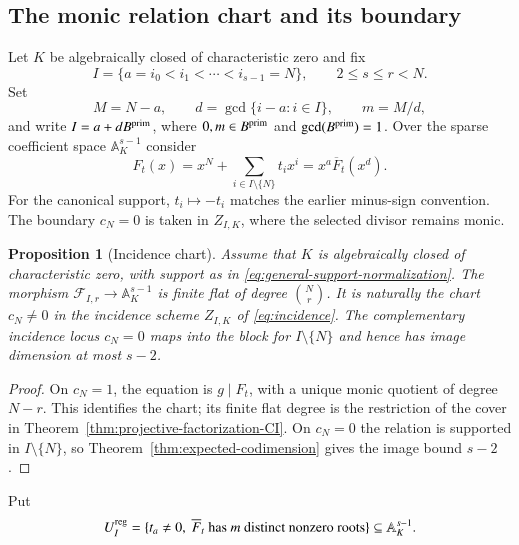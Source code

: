 \documentclass[10pt,fleqn]{article}
\numberwithin{equation}{section}
\newtheorem{proposition}[theorem]{Proposition}
\newcommand{\A}{\mathbb A}
\newcommand{\cF}{\mathcal F}
\begin{document}
\subsection{The monic relation chart and its boundary}

Let $K$ be algebraically closed of characteristic zero and fix
\begin{equation}\label{eq:general-support-normalization}
 I=\{a=i_0<i_1<\cdots<i_{s-1}=N\},\qquad 2\le s\le r<N.
\end{equation}
Set
\begin{equation}\label{eq:lattice-index-data}
 M=N-a,\qquad d=\gcd\{i-a:i\in I\},\qquad m=M/d,
\end{equation}
and write $I=a+dB^{\rm prim}$, where $0,m\in B^{\rm prim}$ and $\gcd(B^{\rm prim})=1$.  Over the sparse coefficient space
$\A_K^{s-1}$ consider
\begin{equation}\label{eq:general-sparse-polynomial}
 F_t(x)=x^N+\sum_{i\in I\setminus\{N\}}t_ix^i
       =x^a\overline F_t(x^d).
\end{equation}
For the canonical support, $t_i\mapsto-t_i$ matches the earlier
minus-sign convention.  The boundary $c_N=0$ is taken in $Z_{I,K}$,
where the selected divisor remains monic.

\begin{proposition}[Incidence chart]\label{prop:incidence-factorization-chart}
Assume that $K$ is algebraically closed of characteristic zero, with support as in
\eqref{eq:general-support-normalization}.
The morphism $\cF_{I,r}\to\A_K^{s-1}$ is finite flat of degree $\binom Nr$.  It is naturally
the chart $c_N\ne0$ in the incidence scheme $Z_{I,K}$ of \eqref{eq:incidence}.  The complementary
incidence locus $c_N=0$ maps into the block for $I\setminus\{N\}$ and hence has image dimension
at most $s-2$.
\end{proposition}

\begin{proof}
On $c_N=1$, the equation is $g\mid F_t$, with a unique monic quotient
of degree $N-r$.  This identifies the chart; its finite flat degree is
the restriction of the cover in Theorem~\ref{thm:projective-factorization-CI}.
On $c_N=0$ the relation is supported in $I\setminus\{N\}$, so
Theorem~\ref{thm:expected-codimension} gives the image bound $s-2$.
\end{proof}

Put
\begin{equation}\label{eq:regular-profile-base}
 U_I^{\rm reg}=\{t_a\ne0,\ \overline F_t\text{ has }m\text{ distinct nonzero roots}\}
 \subseteq\A_K^{s-1}.
\end{equation}
\end{document}
